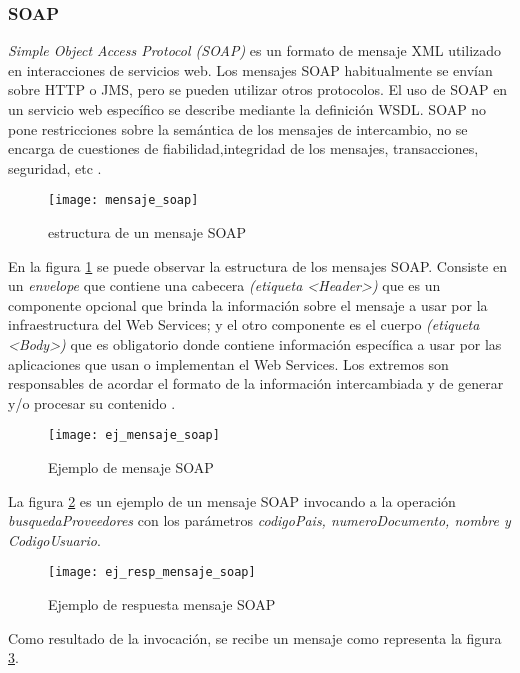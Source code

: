 \subsubsection{SOAP}
\label{MarcoConceptual:SOAP}
\emph{Simple Object Access Protocol (SOAP)} es un formato de mensaje XML utilizado en interacciones de servicios web. Los mensajes SOAP habitualmente se envían sobre HTTP o JMS, pero se pueden utilizar otros protocolos. El uso de SOAP en un servicio web específico se describe mediante la definición WSDL. SOAP no pone restricciones sobre la semántica de los mensajes de intercambio, no se encarga de cuestiones de fiabilidad,integridad de los mensajes, transacciones, seguridad, etc \cite{WebServices:CCIA}.
  \begin{figure}[h]
    \centering
    \texttt{[image: mensaje\_soap]}
    \caption{estructura de un mensaje SOAP}
    \label{figura:mensaje_soap}
  \end{figure}
En la figura \ref{figura:mensaje_soap} se puede observar la estructura de los mensajes SOAP. Consiste en un \emph{envelope} que contiene una cabecera \emph{(etiqueta <Header>)} que es un componente opcional que brinda la información sobre el mensaje a usar por la infraestructura del Web Services; y el otro componente es el cuerpo \emph{(etiqueta <Body>)} que es obligatorio donde contiene información específica a usar por las aplicaciones que usan o implementan el Web Services. Los extremos son responsables de acordar el formato de la información intercambiada y de generar y/o procesar su contenido \cite{WebServices:CCIA}.
  \begin{figure}[h]
    \centering
    \texttt{[image: ej\_mensaje\_soap]}
    \caption{Ejemplo de mensaje SOAP}
    \label{figura:ej_mensaje_soap}
  \end{figure}
La figura \ref{figura:ej_mensaje_soap} es un ejemplo de un mensaje SOAP invocando a la operación \emph{busquedaProveedores} con los parámetros \emph{codigoPais, numeroDocumento, nombre y CodigoUsuario}.
  \begin{figure}[h]
    \centering
    \texttt{[image: ej\_resp\_mensaje\_soap]}
    \caption{Ejemplo de respuesta mensaje SOAP}
    \label{figura:ej_resp_mensaje_soap}
  \end{figure}
Como resultado de la invocación, se recibe un mensaje como representa la figura \ref{figura:ej_resp_mensaje_soap}.
